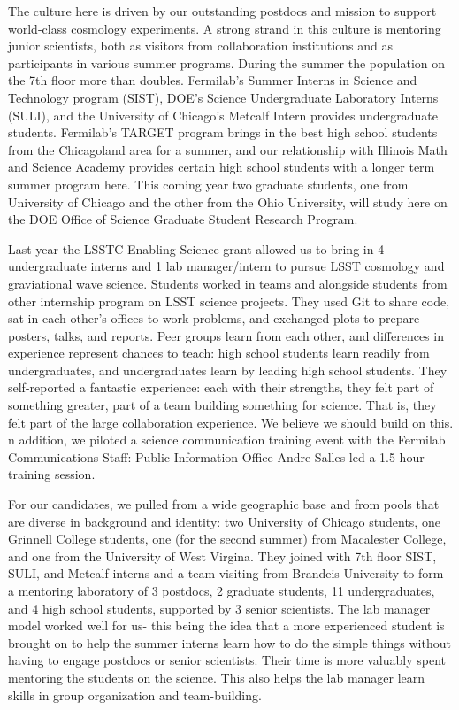 The culture here is driven by our outstanding postdocs and mission to support
world-class cosmology experiments. A strong strand in this culture is mentoring
junior scientists, both  as visitors from collaboration institutions and as participants
in various summer programs.
During the summer the population on the 7th floor more than doubles.
Fermilab's Summer Interns in Science and Technology program (SIST),
DOE's Science Undergraduate Laboratory Interns (SULI), and the University of
Chicago's Metcalf Intern provides undergraduate students. 
Fermilab's TARGET program brings in the best high school 
students from the Chicagoland area for a summer, 
and our relationship with Illinois Math and Science Academy provides
certain high school students with a longer term summer program here.
This coming year two graduate students, one from University of Chicago and the
other from the Ohio University, will study here on the DOE Office of Science
Graduate Student Research Program.

Last year the LSSTC Enabling Science grant allowed us to bring in
4 undergraduate interns and 1 lab manager/intern to pursue LSST
cosmology and graviational wave science. 
Students worked in teams and alongside students from other internship program on LSST science projects. 
They used Git to share code, sat in each other's offices to work problems, and exchanged plots to prepare posters, talks, and reports. 
Peer groups learn from each other,
and differences in experience represent chances to teach: high school
students learn readily from undergraduates, and undergraduates learn
by leading high school students. 
They self-reported a fantastic experience: each with their strengths,
they felt part of something greater, part of a team building something 
for science. That is, they felt part of the large collaboration experience.
We believe we should build on this.
n addition, we piloted a science communication training event with the Fermilab Communications Staff: Public Information Office Andre Salles led a 1.5-hour training session.

For our candidates, we pulled from a wide geographic base and from pools that are diverse in background and identity:
two University of Chicago students, one Grinnell College students, 
one (for the second summer) from Macalester College, and
one from the University of West Virgina. They joined with 7th floor SIST, SULI,
and Metcalf interns and a team visiting from Brandeis University to form
a mentoring laboratory of 3 postdocs, 2 graduate students, 11 undergraduates, and 4
high school students,
supported by 3 senior scientists. The lab manager model worked well for us- this
being the idea that a more experienced student is brought on to help the summer interns
learn how to do the simple things without having to engage postdocs or senior scientists. 
Their time is more valuably spent mentoring the students on the science. 
This also helps the lab manager learn skills in group organization and team-building.

